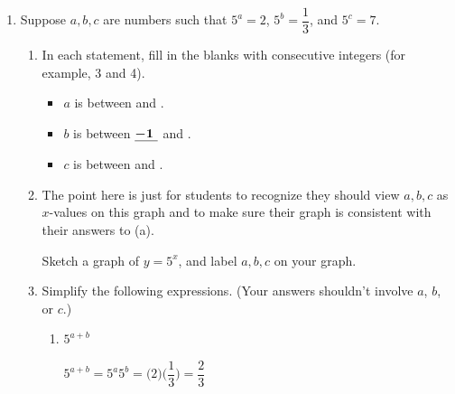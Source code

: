 \documentclass{article}
\begin{document}
\begin{enumerate}
\begin{problem}[\newpage]
    Find the minimum and maximum possible area of the enclosure, if they exist. If they don't exist, explain why. 
  \end{problem}

\item 

  Suppose $a, b, c$ are numbers such that $5^a = 2$, $5^b = \dfrac{1}{3}$, and $5^c = 7$.

  \begin{enumerate}
  \item
    \begin{problem}[\stretch{0.25}]
      In each statement, fill in the blanks with consecutive integers (for example, 3 and 4).
      \begin{itemize}
      \item $a$ is between  and .
      \item $b$ is between $\fitb{0.25in}{-1}$ and .
      \item $c$ is between  and .        
      \end{itemize}
    \end{problem}

  \item

    \begin{workshop}
      The point here is just for students to recognize they should view $a, b, c$ as $x$-values on this graph and to make sure their graph is consistent with their answers to (a). 
    \end{workshop}

    \begin{problem}[\vfill]
      Sketch a graph of $y = 5^x$, and label $a, b, c$ on your graph. 
    \end{problem}

  \item
    Simplify the following expressions. (Your answers shouldn't involve $a$, $b$, or $c$.)

    \begin{enumerate}
    \item
      \begin{problem}[\stretch{0.35}]
        $5^{a + b}$
      \end{problem}

      \begin{solution}
          $5^{a+b} = 5^a 5^b = \Big(2\Big)\Big(\dfrac{1}{3}\Big) = \dfrac{2}{3}$
      \end{solution}


\end{enumerate}
\end{enumerate}
\end{enumerate}
\end{document}
